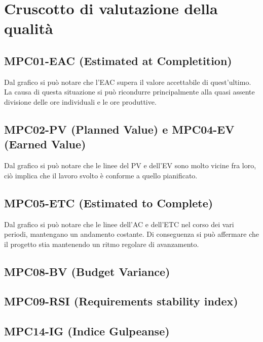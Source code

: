\section{Cruscotto di valutazione della qualità}
\subsection{MPC01-EAC (Estimated at Completition)}
Dal grafico si può notare che l'EAC supera il valore accettabile di quest'ultimo. La causa di questa situazione si può ricondurre principalmente alla quasi assente divisione delle ore individuali e le ore produttive.
\subsection{MPC02-PV (Planned Value) e MPC04-EV (Earned Value)}
Dal grafico si può notare che le linee del PV e dell'EV sono molto vicine fra loro, ciò implica che il lavoro svolto è conforme a quello pianificato.
\subsection{MPC05-ETC (Estimated to Complete)}
Dal grafico si può notare che le linee dell'AC e dell'ETC nel corso dei vari periodi, mantengano un andamento costante. Di conseguenza si può affermare che il progetto stia mantenendo un ritmo regolare di avanzamento. 
\subsection{MPC08-BV (Budget Variance)}

\subsection{MPC09-RSI (Requirements stability index)}
\subsection{MPC14-IG (Indice Gulpeanse)}

